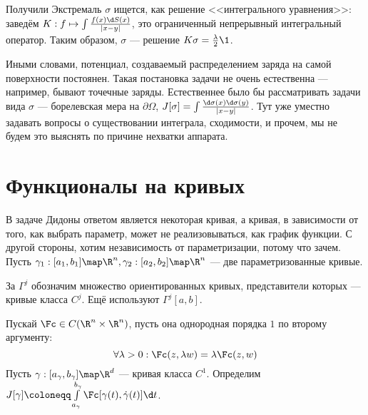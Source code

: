 \documentclass[a4paper]{article}
\begin{document}
    Получили
Экстремаль $\sigma$ ищется, как решение <<интегрального уравнения>>: заведём $K: f \mapsto \int \frac{f(x)\d S(x)}{|x - y|}$, это ограниченный непрерывный интегральный оператор.
    Таким образом, $\sigma$ --- решение $K \sigma = \frac{\lambda}{2}\1$.

    Иными словами, потенциал, создаваемый распределением заряда на самой поверхности постоянен.
    Такая постановка задачи не очень естественна --- например, бывают точечные заряды.
    Естественнее было бы рассматривать задачи вида $\sigma$ --- борелевская мера на $\partial \Omega$, $J[\sigma] = \int\frac{\d\sigma(x)\d \sigma(y)}{|x - y|}$.
        Тут уже уместно задавать вопросы о существовании интеграла, сходимости, и прочем, мы не будем это выяснять по причине нехватки аппарата.
    \section{Функционалы на кривых}
    В задаче Дидоны ответом является некоторая кривая, а кривая, в зависимости от того, как выбрать параметр, может не реализовываться, как график функции.
    С другой стороны, хотим независимость от параметризации, потому что зачем.
    Пусть $\gamma_1: [a_1, b_1] \map \R^n, \gamma_2: [a_2, b_2] \map \R^n$ --- две параметризованные кривые.

    За $\Gamma^j$ обозначим множество ориентированных кривых, представители которых --- кривые класса $C^j$.
    Ещё используют $\Gamma^j[a, b]$.

    Пускай $\Fc \in C(\R^n \times \R^n)$, пусть она однородная порядка $1$ по второму аргументу: \[\forall \lambda > 0: \Fc(z, \lambda w) = \lambda \Fc(z, w)\]
    Пусть $\gamma: [a_\gamma, b_\gamma] \map \R^d$ --- кривая класса $C^1$.
    Определим $J[\gamma] \coloneqq \int\limits_{a_\gamma}^{b_\gamma}\Fc[\gamma(t), \dot{\gamma}(t)]\d t$.
\end{document}
